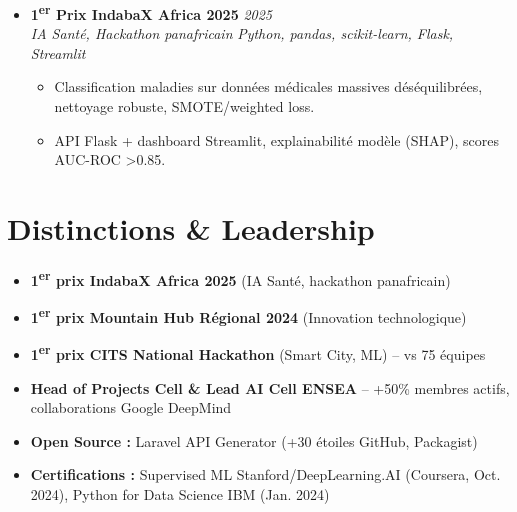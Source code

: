 \documentclass[a4paper,11pt]{article}
\begin{document}
\begin{itemize}[leftmargin=*, label={-}]
    \item \textbf{1\textsuperscript{er} Prix IndabaX Africa 2025} \hfill \textit{2025} \\
    \textit{IA Sant\'e, Hackathon panafricain} \hfill \textit{Python, pandas, scikit-learn, Flask, Streamlit}
    \vspace{-2pt}
    \begin{itemize}[leftmargin=0.4cm, nosep, label=\tiny$\bullet$]
        \item \small{Classification maladies sur donn\'ees m\'edicales massives d\'es\'equilibr\'ees, nettoyage robuste, SMOTE/weighted loss.}
        \item \small{API Flask + dashboard Streamlit, explainabilit\'e mod\`ele (SHAP), scores AUC-ROC >0.85.}
    \end{itemize}
\end{itemize}

\section{Distinctions \& Leadership}
\begin{itemize}[leftmargin=*, label=\tiny$\bullet$, nosep]
    \item \small{\textbf{1\textsuperscript{er} prix IndabaX Africa 2025} (IA Sant\'e, hackathon panafricain)}
    \item \small{\textbf{1\textsuperscript{er} prix Mountain Hub R\'egional 2024} (Innovation technologique)}
    \item \small{\textbf{1\textsuperscript{er} prix CITS National Hackathon} (Smart City, ML) -- vs 75 \'equipes}
    \item \small{\textbf{Head of Projects Cell \& Lead AI Cell ENSEA} -- +50\% membres actifs, collaborations Google DeepMind}
    \item \small{\textbf{Open Source :} Laravel API Generator (+30 \'etoiles GitHub, Packagist)}
    \item \small{\textbf{Certifications :} Supervised ML Stanford/DeepLearning.AI (Coursera, Oct. 2024), Python for Data Science IBM (Jan. 2024)}
\end{itemize}
\end{document}
